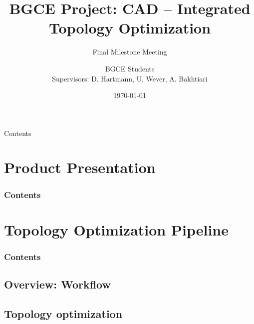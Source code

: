 \documentclass[9pt,pdftex]{beamer}
\title{BGCE Project: CAD -- Integrated Topology Optimization}
\subtitle{Final Milestone Meeting}
\author[S. Joshi, S. Reiz] {
BGCE Students \\
Supervisors: D. Hartmann, U. Wever, A. Bakhtiari} %
\date{\today}
\institute{Technische Universität München}
\begin{document}
\frame{\maketitle}


\begin{frame}{Contents}
\setcounter{tocdepth}{1}
\tableofcontents
\end{frame}

\section{Product Presentation}
  \begin{frame}
  \setcounter{tocdepth}{1}
  \frametitle{Contents}
  \tableofcontents[currentsection]  
  \end{frame}

\section{Topology Optimization Pipeline}

  \begin{frame}
    \setcounter{tocdepth}{2}
  \frametitle{Contents}
  \tableofcontents[currentsection]
  \end{frame}

\subsection{Overview: Workflow}


%



\subsection{Topology optimization}

\end{document}
